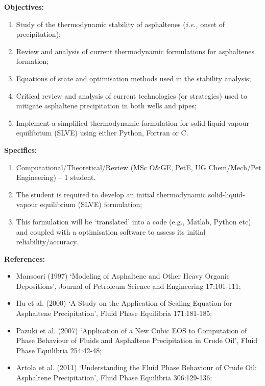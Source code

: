 \documentclass[12pts,a4paper,amsmath,amssymb,floatfix]{article}%
\newcommand{\all}{MSc O$\&$GE, PetE, UG Chem/Mech/Pet Engineering}
\newcommand{\ie}{{\it i.e., }}
\begin{document}
\begin{enumerate}[label=\bfseries Project: \arabic*:]
\noindent
{\bf Objectives:}
\begin{enumerate}
\item Study of the thermodynamic stability of asphaltenes (\ie onset of precipitation); 
\item Review and analysis of current thermodynamic formulations for asphaltenes formation; 
\item Equations of state and optimisation methods used in the stability analysis; 
\item Critical review and analysis of current technologies (or strategies) used to mitigate asphaltene precipitation in both wells and pipes;
\item Implement a simplified thermodynamic formulation for solid-liquid-vapour equilibrium (SLVE) using either Python, Fortran or C.
\end{enumerate} 
 
\noindent
{\bf Specifics:} 
\begin{enumerate}
\item Computational/Theoretical/Review (\all) -- 1 student.
\item The student is required to develop an initial thermodynamic solid-liquid-vapour equilibrium (SLVE) formulation;
\item This formulation will be `translated' into a code (e.g., Matlab, Python etc) and coupled with a optimisation software to assess its initial reliability/accuracy.
\end{enumerate}

\noindent
{\bf References:}
\begin{itemize}
\item Mansoori (1997) `Modeling of Asphaltene and Other Heavy Organic Depositions’, Journal of Petroleum Science and Engineering 17:101-111;
\item Hu et al. (2000) `A Study on the Application of Scaling Equation for Asphaltene Precipitation’, Fluid Phase Equilibria 171:181-185;
\item Pazuki et al. (2007) `Application of a New Cubic EOS to Computation of Phase Behaviour of Fluids and Asphaltene Precipitation in Crude Oil’, Fluid Phase Equilibria 254:42-48;
\item Artola et al. (2011) `Understanding the Fluid Phase Behaviour of Crude Oil: Asphaltene Precipitation’, Fluid Phase Equilibria 306:129-136;
\end{itemize}



\end{enumerate}
\end{document}
